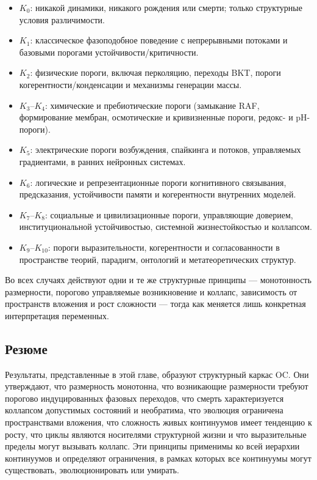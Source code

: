\begin{itemize}
    \item \(K_0\): никакой динамики, никакого рождения или смерти; только структурные условия различимости.
    \item \(K_1\): классическое фазоподобное поведение с непрерывными потоками и базовыми порогами устойчивости/критичности.
    \item \(K_2\): физические пороги, включая перколяцию, переходы BKT, пороги когерентности/конденсации и механизмы генерации массы.
    \item \(K_3\)–\(K_4\): химические и пребиотические пороги (замыкание RAF, формирование мембран, осмотические и кривизненные пороги, редокс- и pH-пороги).
    \item \(K_5\): электрические пороги возбуждения, спайкинга и потоков, управляемых градиентами, в ранних нейронных системах.
    \item \(K_6\): логические и репрезентационные пороги когнитивного связывания, предсказания, устойчивости памяти и когерентности внутренних моделей.
    \item \(K_7\)–\(K_8\): социальные и цивилизационные пороги, управляющие доверием, институциональной устойчивостью, системной жизнестойкостью и коллапсом.
    \item \(K_9\)–\(K_{10}\): пороги выразительности, когерентности и согласованности в пространстве теорий, парадигм, онтологий и метатеоретических структур.
\end{itemize}

Во всех случаях действуют одни и те же структурные принципы --- монотонность размерности, порогово управляемые возникновение и коллапс, зависимость от пространств вложения и рост сложности --- тогда как меняется лишь конкретная интерпретация переменных.

\subsection{Резюме}

Результаты, представленные в этой главе, образуют структурный каркас OC.
Они утверждают, что размерность монотонна, что возникающие размерности требуют порогово индуцированных фазовых переходов, что смерть характеризуется коллапсом допустимых состояний и необратима, что эволюция ограничена пространствами вложения, что сложность живых континуумов имеет тенденцию к росту, что циклы являются носителями структурной жизни и что выразительные пределы могут вызывать коллапс.
Эти принципы применимы ко всей иерархии континуумов и определяют ограничения, в рамках которых все континуумы могут существовать, эволюционировать или умирать.
